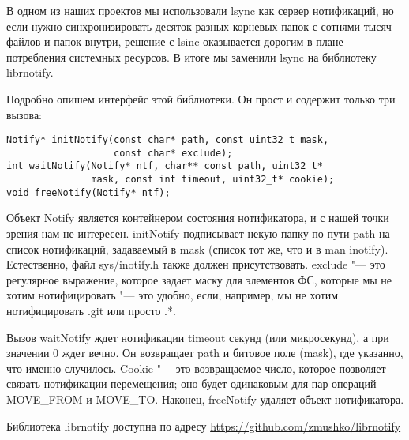\documentclass[10pt, a5paper]{article}
\begin{document}
В одном из наших проектов мы использовали lsync как сервер нотификаций, но если нужно синхронизировать десяток разных корневых папок с сотнями тысяч файлов и папок внутри, решение с lsinc
оказывается дорогим в плане потребления системных ресурсов. 
В итоге мы заменили lsync на библиотеку librnotify. 

Подробно опишем интерфейс этой библиотеки. 
Он прост и содержит только три вызова: 
\begin{verbatim}
Notify* initNotify(const char* path, const uint32_t mask,
                   const char* exclude); 
int waitNotify(Notify* ntf, char** const path, uint32_t*
               mask, const int timeout, uint32_t* cookie); 
void freeNotify(Notify* ntf);
\end{verbatim}

Объект Notify является контейнером состояния нотификатора, и с нашей точки зрения нам не интересен. 
initNotify подписывает некую папку по пути path на список нотификаций, задаваемый в mask (список тот же, что и в man inotify). Естественно, файл \linebreak sys/inotify.h также должен присутствовать. exclude "--- это регулярное выражение, которое задает маску для элементов ФС, которые мы не хотим нотифицировать "--- это удобно, если, например, мы не хотим нотифицировать .git или просто .*.

Вызов waitNotify ждет нотификации timeout секунд (или микросекунд), а при значении 0 ждет вечно. Он возвращает path и битовое поле (mask), где указанно, что именно случилось. 
Cookie "--- это возвращаемое число, которое позволяет связать нотификации перемещения; оно будет одинаковым для пар операций MOVE\_FROM и MOVE\_TO. 
Наконец, freeNotify удаляет объект нотификатора.

Библиотека librnotify доступна по адресу \url{https://github.com/zmushko/librnotify}
\end{document}
